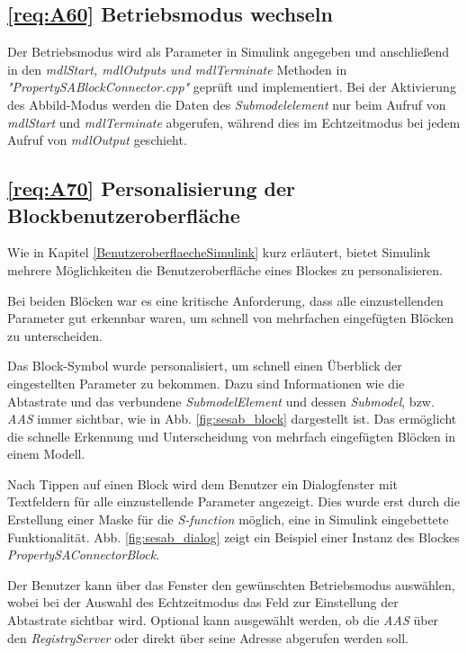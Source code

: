 \subsection{\ref{req:A60} Betriebsmodus wechseln}

Der Betriebsmodus wird als Parameter in Simulink angegeben und anschließend in den \textit{mdlStart, mdlOutputs und mdlTerminate} Methoden in \textit{"PropertySABlockConnector.cpp"} geprüft und implementiert. Bei der Aktivierung des Abbild-Modus werden die Daten des \textit{Submodelelement} nur beim Aufruf von \textit{mdlStart} und \textit{mdlTerminate} abgerufen, während dies im Echtzeitmodus bei jedem Aufruf von \textit{mdlOutput} geschieht.


\subsection{\ref{req:A70} Personalisierung der Blockbenutzeroberfläche} \label{Simulationsumgebung}

Wie in Kapitel \ref{BenutzeroberflaecheSimulink} kurz erläutert, bietet Simulink mehrere Möglichkeiten die Benutzeroberfläche eines Blockes zu personalisieren. 

Bei beiden Blöcken war es eine kritische Anforderung, dass alle einzustellenden Parameter gut erkennbar waren, um schnell von mehrfachen eingefügten Blöcken zu unterscheiden.

Das Block-Symbol wurde personalisiert, um schnell einen Überblick der eingestellten Parameter zu bekommen. Dazu sind Informationen wie die Abtastrate und das verbundene \textit{SubmodelElement} und dessen \textit{Submodel}, bzw. \textit{AAS} immer sichtbar, wie in Abb. \ref{fig:sesab_block} dargestellt ist. Das ermöglicht die schnelle Erkennung und Unterscheidung von mehrfach eingefügten Blöcken in einem Modell.





Nach Tippen auf einen Block wird dem Benutzer ein Dialogfenster mit Textfeldern für alle einzustellende Parameter angezeigt. Dies wurde erst durch die Erstellung einer Maske für die \textit{S-function} möglich, eine in Simulink eingebettete Funktionalität. Abb. \ref{fig:sesab_dialog} zeigt ein Beispiel einer Instanz des Blockes \textit{PropertySAConnectorBlock}.





Der Benutzer kann über das Fenster den gewünschten Betriebsmodus auswählen, wobei bei der Auswahl des Echtzeitmodus das Feld zur Einstellung der Abtastrate sichtbar wird. Optional kann ausgewählt werden, ob die \textit{AAS} über den \textit{RegistryServer} oder direkt über seine Adresse abgerufen werden soll.


